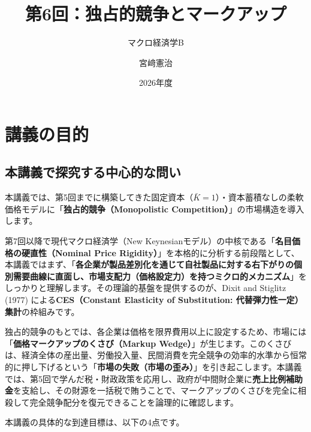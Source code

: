 \documentclass[
  japanese,
  lualatex,
  ja=standard,
  12pt,
  a4paper]{ltjsarticle}
\title{第6回：独占的競争とマークアップ}
\subtitle{マクロ経済学B}
\author{宮﨑憲治}
\date{2026年度}
\renewcommand*\contentsname{目次}
\newcommand\contentsname{目次}
\begin{document}
\maketitle

\renewcommand*\contentsname{目次}
{
\setcounter{tocdepth}{1}
\tableofcontents
}

\section{講義の目的}\label{ux8b1bux7fa9ux306eux76eeux7684}

\subsection{本講義で探究する中心的な問い}\label{ux672cux8b1bux7fa9ux3067ux63a2ux7a76ux3059ux308bux4e2dux5fc3ux7684ux306aux554fux3044}

本講義では、第5回までに構築してきた固定資本（\(\bar{K}=1\)）・資本蓄積なしの柔軟価格モデルに「\textbf{独占的競争（Monopolistic
Competition）}」の市場構造を導入します。

第7回以降で現代マクロ経済学（New
Keynesianモデル）の中核である「\textbf{名目価格の硬直性（Nominal Price
Rigidity）}」を本格的に分析する前段階として、本講義ではまず、「\textbf{各企業が製品差別化を通じて自社製品に対する右下がりの個別需要曲線に直面し、市場支配力（価格設定力）を持つミクロ的メカニズム}」をしっかりと理解します。その理論的基盤を提供するのが、Dixit
and Stiglitz (1977) による\textbf{CES（Constant Elasticity of
Substitution: 代替弾力性一定）集計}の枠組みです。

独占的競争のもとでは、各企業は価格を限界費用以上に設定するため、市場には「\textbf{価格マークアップのくさび（Markup
Wedge）}」が生じます。このくさびは、経済全体の産出量、労働投入量、民間消費を完全競争の効率的水準から恒常的に押し下げるという「\textbf{市場の失敗（市場の歪み）}」を引き起こします。本講義では、第5回で学んだ税・財政政策を応用し、政府が中間財企業に\textbf{売上比例補助金}を支給し、その財源を一括税で賄うことで、マークアップのくさびを完全に相殺して完全競争配分を復元できることを論理的に確認します。

本講義の具体的な到達目標は、以下の4点です。
\end{document}
